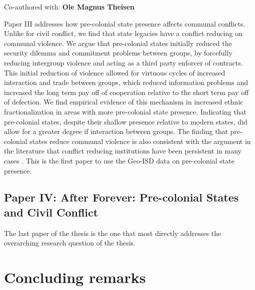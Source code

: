 Co-authored with: \textbf{Ole Magnus Theisen}

Paper III addresses how pre-colonial state presence affects communal conflicts.
Unlike for civil conflict, we find that state legacies have a conflict reducing
on communal violence. We argue that pre-colonial states initially reduced the
security dilemma and commitment problems between groups, by forcefully reducing
intergroup violence and acting as a third party enforcer of contracts. This
initial reduction of violence allowed for virtuous cycles of increased
interaction and trade between groups, which reduced information problems and
increased the long term pay off of cooperation relative to the short term pay
off of defection. We find empirical evidence of this mechanism in increased
ethnic fractionalization in areas with more pre-colonial state presence.
Indicating that pre-colonial states, despite their shallow presence relative to
modern states, did allow for a greater degree if interaction between groups. The
finding that pre-colonial states reduce communal violence is also consistent
with the argument in the literature that conflict reducing institutions have
been persistent in many cases \citep{Wig2018}. This is the first paper to use
the Geo-ISD data on pre-colonial state presence.

\subsection{Paper IV: After Forever: Pre-colonial States and Civil Conflict}
\label{Paper 4}

The last paper of the thesis is the one that most directly addresses the
overarching research question of the thesis.

\section{Concluding remarks} \label{Concluding remarks}

\clearpage




